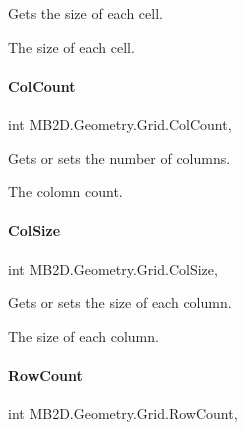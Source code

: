 Gets the size of each cell. 

The size of each cell.\hypertarget{class_m_b2_d_1_1_geometry_1_1_grid_a515c09f56ad55f3742b6a0eccdb15856}{}\label{class_m_b2_d_1_1_geometry_1_1_grid_a515c09f56ad55f3742b6a0eccdb15856} 
\paragraph{\texorpdfstring{Col\+Count}{ColCount}}
{\footnotesize\ttfamily int M\+B2\+D.\+Geometry.\+Grid.\+Col\+Count\hspace{0.3cm}{\ttfamily [get]}, {\ttfamily [set]}}



Gets or sets the number of columns. 

The colomn count.\hypertarget{class_m_b2_d_1_1_geometry_1_1_grid_aef6e8277c73fcb160fa551836f3685da}{}\label{class_m_b2_d_1_1_geometry_1_1_grid_aef6e8277c73fcb160fa551836f3685da} 
\paragraph{\texorpdfstring{Col\+Size}{ColSize}}
{\footnotesize\ttfamily int M\+B2\+D.\+Geometry.\+Grid.\+Col\+Size\hspace{0.3cm}{\ttfamily [get]}, {\ttfamily [set]}}



Gets or sets the size of each column. 

The size of each column.\hypertarget{class_m_b2_d_1_1_geometry_1_1_grid_ad2599c5d630bb783ff2ba062c276be9a}{}\label{class_m_b2_d_1_1_geometry_1_1_grid_ad2599c5d630bb783ff2ba062c276be9a} 
\paragraph{\texorpdfstring{Row\+Count}{RowCount}}
{\footnotesize\ttfamily int M\+B2\+D.\+Geometry.\+Grid.\+Row\+Count\hspace{0.3cm}{\ttfamily [get]}, {\ttfamily [set]}}



